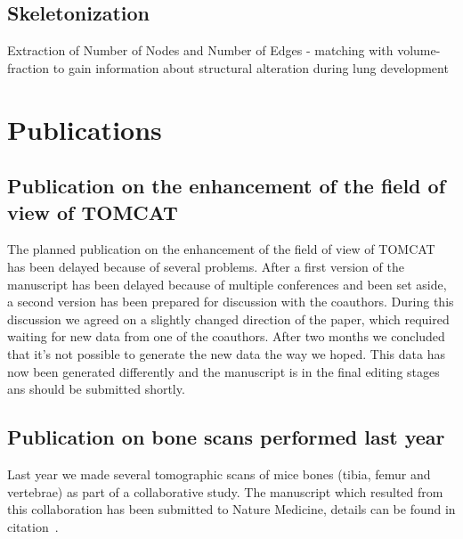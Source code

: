 \documentclass[a4paper,twoside,DIV=calc]{scrartcl}
\begin{document}
\subsection{Skeletonization}
Extraction of Number of Nodes and Number of Edges - matching with volume-fraction to gain information about structural alteration during lung development

\section{Publications}\label{sec:publications}
\subsection{Publication on the enhancement of the field of view of TOMCAT}
The planned publication on the enhancement of the field of view of TOMCAT has been delayed because of several problems. After a first version of the manuscript has been delayed because of multiple conferences and been set aside, a second version has been prepared for discussion with the coauthors. During this discussion we agreed on a slightly changed direction of the paper, which required waiting for new data from one of the coauthors. After two months we concluded that it's not possible to generate the new data the way we hoped. This data has now been generated differently and the manuscript is in the final editing stages ans should be submitted shortly.

\subsection{Publication on bone scans performed last year}
Last year we made several tomographic scans of mice bones (tibia, femur and vertebrae) as part of a collaborative study. The manuscript which resulted from this collaboration has been submitted to Nature Medicine, details can be found in citation~\cite{Sausbier2009b}.



\end{document}
